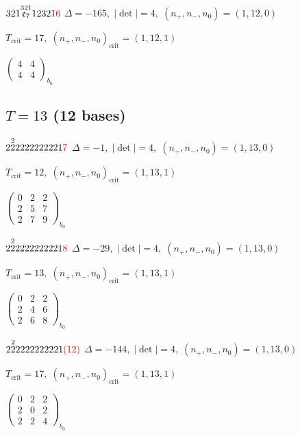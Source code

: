 \documentclass[10pt]{article}
\begin{document}
$321\overset{321}{\mathfrak{e}_7}12321\textcolor{red}{6}$ \quad $\Delta=-165,\; |\det|=4,\; (n_+,n_-,n_0)=(1,12,0)$

\hspace{1em}$T_{\text{crit}}=17,\; (n_+,n_-,n_0)_{\text{crit}}=(1,12,1)$

\hspace{2em}$\left(\begin{smallmatrix}4 & 4 \\ 4 & 4\end{smallmatrix}\right)_{\!b_0}$


\subsection*{$T = 13$ \quad (12 bases)}
\smallskip

$2\overset{2}{2}2222222221\textcolor{red}{7}$ \quad $\Delta=-1,\; |\det|=4,\; (n_+,n_-,n_0)=(1,13,0)$

\hspace{1em}$T_{\text{crit}}=12,\; (n_+,n_-,n_0)_{\text{crit}}=(1,13,1)$

\hspace{2em}$\left(\begin{smallmatrix}0 & 2 & 2 \\ 2 & 5 & 7 \\ 2 & 7 & 9\end{smallmatrix}\right)_{\!b_0}$

$2\overset{2}{2}2222222221\textcolor{red}{8}$ \quad $\Delta=-29,\; |\det|=4,\; (n_+,n_-,n_0)=(1,13,0)$

\hspace{1em}$T_{\text{crit}}=13,\; (n_+,n_-,n_0)_{\text{crit}}=(1,13,1)$

\hspace{2em}$\left(\begin{smallmatrix}0 & 2 & 2 \\ 2 & 4 & 6 \\ 2 & 6 & 8\end{smallmatrix}\right)_{\!b_0}$

$2\overset{2}{2}2222222221\textcolor{red}{(12)}$ \quad $\Delta=-144,\; |\det|=4,\; (n_+,n_-,n_0)=(1,13,0)$

\hspace{1em}$T_{\text{crit}}=17,\; (n_+,n_-,n_0)_{\text{crit}}=(1,13,1)$

\hspace{2em}$\left(\begin{smallmatrix}0 & 2 & 2 \\ 2 & 0 & 2 \\ 2 & 2 & 4\end{smallmatrix}\right)_{\!b_0}$
\end{document}
